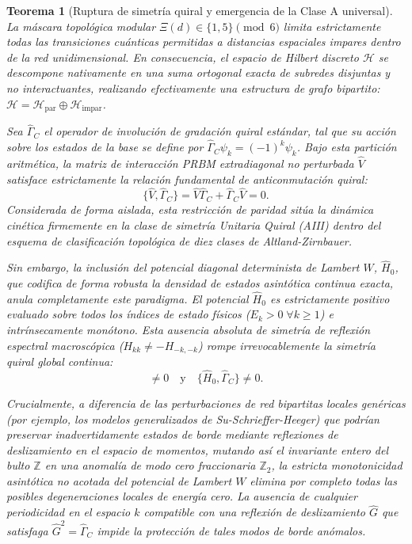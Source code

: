 \documentclass[aps,prl,preprint,superscriptaddress,floatfix]{revtex4-2}
\newtheorem{theorem}{Teorema}[section]
\newcommand{\Hilb}{\mathcal{H}}
\begin{document}
\begin{theorem}[Ruptura de simetría quiral y emergencia de la Clase A universal]
\label{thm:chiral_breaking}
La máscara topológica modular $\Xi(d) \in \{1,5\} \pmod 6$ limita estrictamente todas las transiciones cuánticas permitidas a distancias espaciales \emph{impares} dentro de la red unidimensional. En consecuencia, el espacio de Hilbert discreto $\Hilb$ se descompone nativamente en una suma ortogonal exacta de subredes disjuntas y no interactuantes, realizando efectivamente una estructura de grafo bipartito: $\Hilb = \Hilb_{\text{par}} \oplus \Hilb_{\text{impar}}$.

Sea $\hat{\Gamma}_C$ el operador de involución de gradación quiral estándar, tal que su acción sobre los estados de la base se define por $\hat{\Gamma}_C \psi_k = (-1)^k \psi_k$. Bajo esta partición aritmética, la matriz de interacción PRBM extradiagonal no perturbada $\hat{V}$ satisface estrictamente la relación fundamental de anticonmutación quiral:
\begin{equation}
    \{ \hat{V}, \hat{\Gamma}_C \} = \hat{V}\hat{\Gamma}_C + \hat{\Gamma}_C\hat{V} = 0.
\end{equation}
Considerada de forma aislada, esta restricción de paridad sitúa la dinámica cinética firmemente en la clase de simetría Unitaria Quiral (AIII) dentro del esquema de clasificación topológica de diez clases de Altland-Zirnbauer.

Sin embargo, la inclusión del potencial diagonal determinista de Lambert $W$, $\hat{H}_0$, que codifica de forma robusta la densidad de estados asintótica continua exacta, anula completamente este paradigma. El potencial $\hat{H}_0$ es estrictamente positivo evaluado sobre todos los índices de estado físicos ($E_k > 0 \;\forall k \ge 1$) e intrínsecamente monótono. Esta ausencia absoluta de simetría de reflexión espectral macroscópica ($H_{kk} \neq -H_{-k,-k}$) rompe irrevocablemente la simetría quiral global continua:
\begin{equation}
    [\hat{H}_0, \hat{\Gamma}_C] \neq 0 \quad \text{y} \quad \{ \hat{H}_0, \hat{\Gamma}_C \} \neq 0.
\end{equation}

Crucialmente, a diferencia de las perturbaciones de red bipartitas locales genéricas (por ejemplo, los modelos generalizados de Su-Schrieffer-Heeger) que podrían preservar inadvertidamente estados de borde mediante reflexiones de deslizamiento en el espacio de momentos, mutando así el invariante entero del bulto $\mathbb{Z}$ en una anomalía de modo cero fraccionaria $\mathbb{Z}_2$, la estricta monotonicidad asintótica no acotada del potencial de Lambert $W$ elimina por completo todas las posibles degeneraciones locales de energía cero. La ausencia de cualquier periodicidad en el espacio $k$ compatible con una reflexión de deslizamiento $\hat{G}$ que satisfaga $\hat{G}^2 = \hat{\Gamma}_C$ impide la protección de tales modos de borde anómalos.


\end{theorem}
\end{document}
